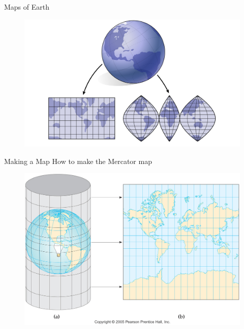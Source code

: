 \documentclass[UKenglish]{beamer}
\begin{document}
\begin{frame}{Maps of Earth}
\vfill
    \begin{figure}[H]
        \centering
        \includegraphics[width=\textwidth]{Figures/maps.png}
    \end{figure}
\end{frame}

\begin{frame}{Making a Map}
    How to make the Mercator map
    \vfill
    \begin{figure}[H]
        \centering
        \includegraphics[width=.8\textwidth]{Figures/mercator.jpg}
    \end{figure}
\end{frame}
\end{document}
